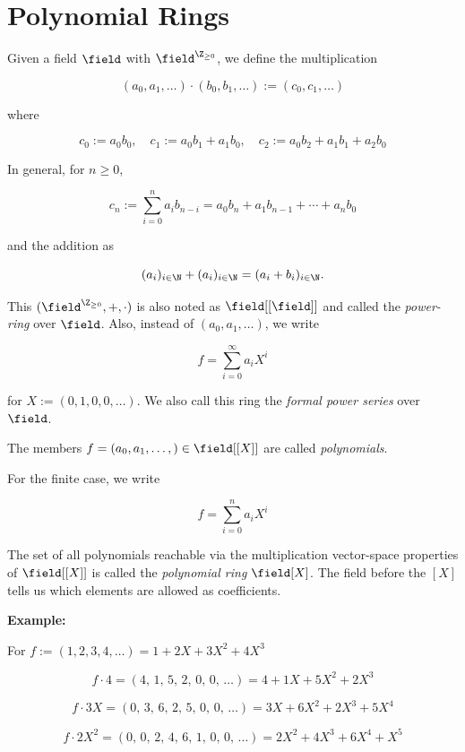 \chapter{Polynomial Rings}

Given a field \(\field\) with \(\field^{\Z_{\ge 0}}\), we define the multiplication 

\[
    (a_0, a_1, \dots ) \cdot (b_0, b_1, \dots ) := (c_0, c_1, \dots) 
\]

where 

\[
    c_0 := a_0 b_0, \quad c_1:= a_0 b_1 + a_1 b_0, \quad c_2 := a_0 b_2 + a_1 b_1 + a_2 b_0
\]

In general, for \(n \ge 0\),

\[
    c_n := \sum_{i = 0}^{n} a_i b_{n - i} = a_0 b_{n} + a_1 b_{n - 1} + \cdots + a_n b_0
\]

and the addition as 

\[
    (a_i)_{i \in \N} + (a_i)_{i \in \N} = (a_i + b_i)_{i \in \N}.
\]

This \((\field^{\Z_{\ge 0}}, +, \cdot)\) is also noted as \(\field[[\field]]\) and 
called the \emph{power-ring} over \(\field\). Also, instead of \((a_0, a_1, \dots)\), we write 

\[
    f = \sum_{i=0}^{\infty} a_i X^i
\]

for \(X := (0, 1, 0, 0, \dots)\). We also call this ring the \emph{formal power series} over \(\field\).  

The members \(f = (a_0, a_1, \dots, ) \in \field [[X]]\) are called \emph{polynomials}.

For the finite case, we write 

\[
    f = \sum_{i=0}^{n} a_i X^i
\]

The set of all polynomials reachable via the multiplication vector-space properties of \(\field[[X]]\) is 
called the \emph{polynomial ring} \(\field[X]\). The field before the \([X]\) tells us which elements 
are allowed as coefficients.

\textbf{Example:}

For \(f := (1,2,3,4, \dots) = 1 + 2X + 3X^2 + 4X^3 \)

\[
    f \cdot 4 = (4,\,1,\,5,\,2,\,0,\,0,\,\ldots) = 4 + 1X + 5X^{2} + 2X^{3}
\]

\[
    f \cdot 3X = (0,\,3,\,6,\,2,\,5,\,0,\,0,\,\ldots) = 3X + 6X^{2} + 2X^{3} + 5X^{4}
\]

\[
    f \cdot 2X^{2} = (0,\,0,\,2,\,4,\,6,\,1,\,0,\,0,\,\ldots) = 2X^{2} + 4X^{3} + 6X^{4} + X^{5}
\]

